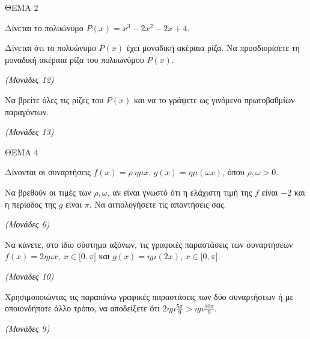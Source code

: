 \documentclass[11pt,a4paper,twoside]{book}
\newcommand{\monades}[1]{\hfill \textit{(Μονάδες #1)}}
\begin{document}
\vspace{4mm}

ΘΕΜΑ 2

Δίνεται το πολυώνυμο $P(x) = x^{3} - 2x^{2} - 2x + 4.$

\begin{alist}
\item Δίνεται ότι το πολυώνυμο $P(x)$ έχει μοναδική ακέραια ρίζα. Να προσδιορίσετε τη μοναδική ακέραια ρίζα του πολυωνύμου $P(x).$

\monades{12}

\item Να βρείτε όλες τις ρίζες του $P(x)$ και να το γράψετε ως γινόμενο πρωτοβαθμίων παραγόντων.

\monades{13}
\end{alist}

\vspace{4mm}

ΘΕΜΑ 4

Δίνονται οι συναρτήσεις $f(x) = \rho\ \eta\mu x$, $g(x) = \eta\mu(\omega x)$, όπου $\rho,\omega > 0.$

\begin{alist}
\item Να βρεθούν οι τιμές των $\rho,\omega$, αν είναι γνωστό ότι η ελάχιστη τιμή της $f$ είναι $- 2$ και η περίοδος της $g$ είναι $\pi$. Να αιτιολογήσετε τις απαντήσεις σας.

\monades{6}

\item

\end{alist}
\begin{alist}
\item
  Να κάνετε, στο ίδιο σύστημα αξόνων, τις γραφικές παραστάσεις των συναρτήσεων $f(x) = 2\eta\mu x,\ x \in \lbrack 0,\pi\rbrack$ και $g(x) = \eta\mu(2x)$, $x \in \lbrack 0,\pi\rbrack.$

\monades{10}


\end{alist}
\begin{alist}
\item
  Χρησιμοποιώντας τις παραπάνω γραφικές παραστάσεις των δύο συναρτήσεων ή με οποιονδήποτε άλλο τρόπο, να αποδείξετε ότι $2\eta\mu\frac{5\pi}{9} > \eta\mu\frac{10\pi}{9}$.

\monades{9}
\end{alist}

\vspace{4mm}
\end{document}

